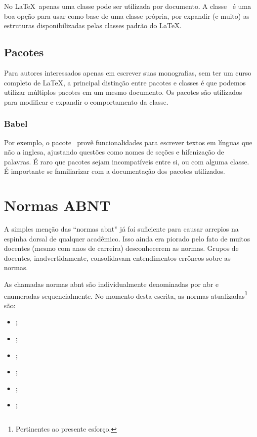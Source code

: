 No \LaTeX\, apenas uma classe pode ser utilizada por documento. A classe \memoir\ é uma boa opção para usar como base de uma classe própria, por expandir (e muito) as estruturas disponibilizadas pelas classes padrão do \LaTeX.

\subsection{Pacotes}

Para autores interessados apenas em escrever suas monografias, sem ter um curso completo de \LaTeX, a principal distinção entre pacotes e classes é que podemos utilizar múltiplos pacotes em um mesmo documento. Os pacotes são utilizados para modificar e expandir o comportamento da classe.

\subsubsection{Babel}

Por exemplo, o pacote \babel\ provê funcionalidades para escrever textos em línguas que não a inglesa, ajustando questões como nomes de seções e hifenização de palavras. É raro que pacotes sejam incompatíveis entre si, ou com alguma classe. É importante se familiarizar com a documentação dos pacotes utilizados.

\section{Normas ABNT}

A simples menção das \enquote{normas \ac{abnt}} já foi suficiente para causar arrepios na espinha dorsal de qualquer acadêmico. Isso ainda era piorado pelo fato de muitos docentes (mesmo com anos de carreira) desconhecerem as normas. Grupos de docentes, inadvertidamente, consolidavam entendimentos errôneos sobre as normas.

As chamadas normas \ac{abnt} são individualmente denominadas por \ac{nbr} e enumeradas sequencialmente. No momento desta escrita, as normas atualizadas\footnote{Pertinentes ao presente esforço.} são:
\begin{itemize}
	\item {} \cite{NBR6023};
	\item {} \cite{NBR6024};
	\item {} \cite{NBR6027};
	\item {} \cite{NBR6028};
	\item {} \cite{NBR10520};
	\item {} \cite{NBR14724};
\end{itemize}

